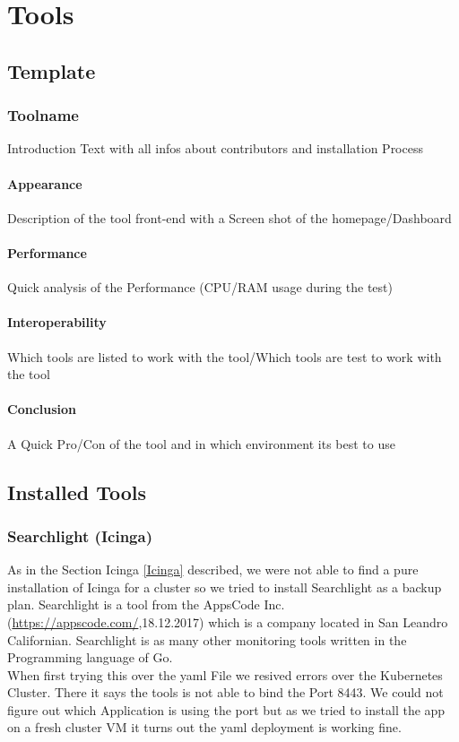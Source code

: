  
\chapter{Tools} %
\section{Template}
\subsection{Toolname}
\label{Toolname} %
Introduction Text with all infos about contributors and installation Process
\subsubsection{Appearance}%
Description of the tool front-end with a Screen shot of the homepage/Dashboard
\subsubsection{Performance}
Quick analysis of the Performance (CPU/RAM usage during the test)
\subsubsection{Interoperability}
Which tools are listed to work with the tool/Which tools are test to work with the tool
\subsubsection{Conclusion}
A Quick Pro/Con of the tool and in which environment its best to use
\section{Installed Tools}%
\subsection{Searchlight (Icinga)}
\label{searchlight}
As in the Section Icinga \ref{Icinga} described, we were not able to find a pure installation of Icinga for a cluster so we tried to install Searchlight as a backup plan.
Searchlight is a tool from the AppsCode Inc. (\url{https://appscode.com/},18.12.2017) which is a company located in San Leandro Californian. 
Searchlight is as many other monitoring tools written in the Programming language of Go.
\\
When first trying this over the yaml File we resived errors over the Kubernetes Cluster. There it says the tools is not able to bind the Port 8443. We could not figure out which Application is using the port but as we tried to install the app on a fresh cluster VM it turns out the yaml deployment is working fine.
